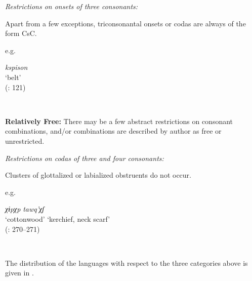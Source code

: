\ex
{}

\textit{Restrictions on onsets of three consonants:}

Apart from a few exceptions, triconsonantal onsets or codas are always of the form CsC.

e.g. \parbox[t]{7cm}{\textit{kspison}\\
    ‘belt’\\
    (\citealt{LeSourd1993}: 121)}\smallskip\\
\z
\z

\ea\label{ex:3.29}
\textbf{Relatively Free:} There may be a few abstract restrictions on consonant combinations, and/or combinations are described by author as free or unrestricted.\medskip\\

\textit{Restrictions on codas of three and four consonants:}

Clusters of glottalized or labialized obstruents do not occur.

e.g. \parbox[t]{9cm}{\gll \textit{χɨpχp}    {\hspace{1cm}}    \textit{tawq’χʃ}\\
    ‘cottonwood’   {\hspace{1cm}}   ‘kerchief, neck scarf’\\
\glt (\citealt{HargusBeavert2002}: 270--271)}\smallskip\\
\z

  The distribution of the languages with respect to the three categories above is given in .

